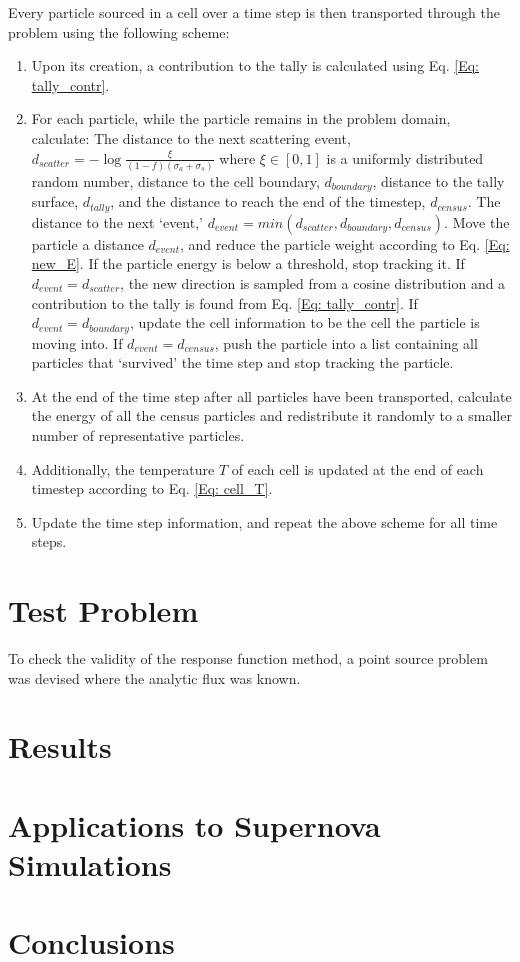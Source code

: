 \documentclass[]{article}
\begin{document}
    Every particle sourced in a cell over a time step is then transported through the problem using the following scheme:  
	\begin{enumerate}
		\item Upon its creation, a contribution to the tally is calculated using Eq. \ref{Eq: tally_contr}.
		\item For each particle, while the particle remains in the problem domain, calculate:
			\subitem The distance to the next scattering event, $d_{scatter} = -\log{\frac{\xi}{(1 - f)(\sigma_{a} + \sigma_{s})}}$ where $\xi \in [0,1]$ is a uniformly distributed random number, distance to the cell boundary, $d_{boundary}$, distance to the tally surface, $d_{tally}$, and the distance to reach the end of the timestep, $d_{census}$.
			\subitem The distance to the next `event,' $d_{event} = min(d_{scatter}, d_{boundary}, d_{census})$.
			\subitem Move the particle a distance $d_{event}$, and reduce the particle weight according to Eq. \ref{Eq: new_E}.
	     	\subitem If the particle energy is below a threshold, stop tracking it.
			\subitem If $d_{event} = d_{scatter}$, the new direction is sampled from a cosine distribution and a contribution to the tally is found from Eq. \ref{Eq: tally_contr}.
			\subitem If $d_{event} = d_{boundary}$, update the cell information to be the cell the particle is moving into.
			\subitem If $d_{event} = d_{census}$, push the particle into a list containing all particles that `survived' the time step and stop tracking the particle.
		\item At the end of the time step after all particles have been transported, calculate the energy of all the census particles and redistribute it randomly to a smaller number of representative particles.
		\item Additionally, the temperature $T$ of each cell is updated at the end of each timestep according to Eq. \ref{Eq: cell_T}.
			
		\item Update the time step information, and repeat the above scheme for all time steps. 
	\end{enumerate}

\section{Test Problem}
	To check the validity of the response function method, a point source problem was devised where the analytic flux was known. 

\section{Results}


\section{Applications to Supernova Simulations}


\section{Conclusions}


\begin{thebibliography}{99}
	\bibitem{}
\end{thebibliography}	
\end{document}
